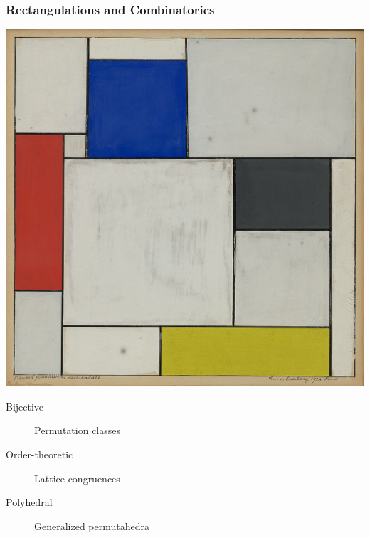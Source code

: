 \documentclass[11pt]{beamer}%
\begin{document}
\begin{frame}
  \frametitle{Rectangulations and Combinatorics}
  \begin{center}
  \includegraphics[height=.6\textheight]{doesburg.png}
  \end{center}
  \begin{description}
  \item[Bijective] Permutation classes
  \item[Order-theoretic] Lattice congruences
  \item[Polyhedral] Generalized permutahedra
  \end{description}  
\end{frame}
\end{document}
